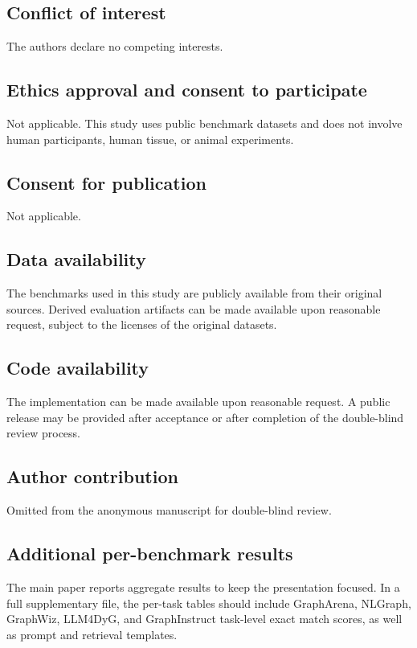 \documentclass[pdflatex,sn-mathphys-num]{sn-jnl}
\theoremstyle{thmstyleone}
\theoremstyle{thmstyletwo}
\theoremstyle{thmstylethree}
\begin{document}
\subsection*{Conflict of interest}
The authors declare no competing interests.

\subsection*{Ethics approval and consent to participate}
Not applicable. This study uses public benchmark datasets and does not involve human participants, human tissue, or animal experiments.

\subsection*{Consent for publication}
Not applicable.

\subsection*{Data availability}
The benchmarks used in this study are publicly available from their original sources. Derived evaluation artifacts can be made available upon reasonable request, subject to the licenses of the original datasets.

\subsection*{Code availability}
The implementation can be made available upon reasonable request. A public release may be provided after acceptance or after completion of the double-blind review process.

\subsection*{Author contribution}
Omitted from the anonymous manuscript for double-blind review.

\begin{appendices}

\section{Additional per-benchmark results}\label{app:details}

The main paper reports aggregate results to keep the presentation focused. In a full supplementary file, the per-task tables should include GraphArena, NLGraph, GraphWiz, LLM4DyG, and GraphInstruct task-level exact match scores, as well as prompt and retrieval templates.

\end{appendices}


\end{document}
